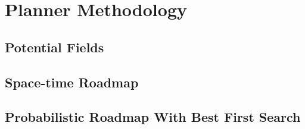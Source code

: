 


\chapter{Planner Methodology}

\label{chapter:plannermethodology}

\section{Potential Fields}

\section{Space-time Roadmap}

\section{Probabilistic Roadmap With Best First Search}


